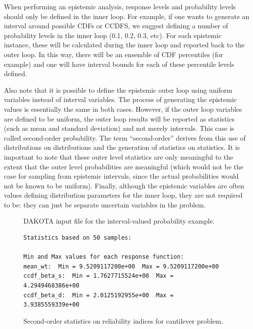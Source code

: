 When performing an epistemic analysis, response levels and 
probability levels should only be defined in the inner loop. 
For example, if one wants to generate an interval around possible 
CDFs or CCDFS, we suggest defining a number of probability levels 
in the inner loop (0.1, 0.2, 0.3, etc).  For each epistemic instance, 
these will be calculated during the inner loop and reported back to the 
outer loop.  In this way, there will be an ensemble of CDF percentiles 
(for example) and one will have interval bounds for each of these 
percentile levels defined.  

Also note that it is possible to define the epistemic outer 
loop using uniform variables instead of interval variables.  The 
process of generating the epistemic values is essentially the 
same in both cases.  However, if the outer loop variables are 
defined to be uniform, the outer loop results will be reported as 
statistics (such as mean and standard deviation) and not merely intervals. 
This case is called second-order probability. 
The term ``second-order'' derives from this use of distributions on
distributions and the generation of statistics on statistics. 
It is important to note that these outer level
statistics are only meaningful to the extent that the outer level
probabilities are meaningful (which would not be the case for sampling
from epistemic intervals, since the actual probabilities would not be
known to be uniform).  Finally, although the epistemic variables are 
often values defining distribution parameters for the inner loop, 
they are not required to be: they can just be separate uncertain variables 
in the problem. 
\begin{figure}
  \centering
  \begin{bigbox}
    \begin{tiny}
    \end{tiny}
  \end{bigbox}
  \caption{DAKOTA input file for the interval-valued probability example.}
  \label{models:ex:2ndprob}
\end{figure}

\begin{figure}
\centering
\begin{bigbox}
\begin{small}
\begin{verbatim}
Statistics based on 50 samples:

Min and Max values for each response function:
mean_wt:  Min = 9.5209117200e+00  Max = 9.5209117200e+00
ccdf_beta_s:  Min = 1.7627715524e+00  Max = 4.2949468386e+00
ccdf_beta_d:  Min = 2.0125192955e+00  Max = 3.9385559339e+00

\end{verbatim}
\end{small}
\end{bigbox}
\caption{Second-order statistics on reliability indices for cantilever problem.}
\label{models:ex:2ndprob_res}
\end{figure}

